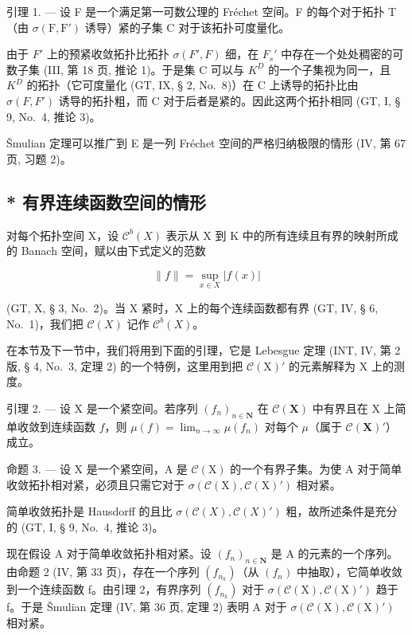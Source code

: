 引理 1. --- 设 F 是一个满足第一可数公理的 Fréchet 空间。F 的每个对于拓扑 T（由 \(\sigma(\mathrm{F},\mathrm{F}')\) 诱导）紧的子集 C 对于该拓扑可度量化。

由于 \(F'\) 上的预紧收敛拓扑比拓扑 \(\sigma(F', F)\) 细，在 \(F_{s}'\) 中存在一个处处稠密的可数子集 (III, 第 18 页, 推论 1)。于是集 C 可以与 \(K^{D}\) 的一个子集视为同一，且 \(K^{D}\) 的拓扑（它可度量化 (GT, IX, § 2, No.~8)）在 C 上诱导的拓扑比由 \(\sigma(F, F')\) 诱导的拓扑粗，而 C 对于后者是紧的。因此这两个拓扑相同 (GT, I, § 9, No.~4, 推论 3)。

Šmulian 定理可以推广到 E 是一列 Fréchet 空间的严格归纳极限的情形 (IV, 第 67 页, 习题 2)。

\subsection{* 有界连续函数空间的情形}

对每个拓扑空间 X，设 \(\mathcal{C}^{b}(X)\) 表示从 X 到 K 中的所有连续且有界的映射所成的 Banach 空间，赋以由下式定义的范数

\[
\| f \| = \sup _ {x \in X} | f (x) |\tag{6}
\]

(GT, X, § 3, No.~2)。当 X 紧时，X 上的每个连续函数都有界 (GT, IV, § 6, No.~1)，我们把 \(\mathcal{C}(X)\) 记作 \(\mathcal{C}^b(X)\)。

在本节及下一节中，我们将用到下面的引理，它是 Lebesgue 定理 (INT, IV, 第 2 版, § 4, No.~3, 定理 2) 的一个特例，这里用到把 \(\mathcal{C}(\mathrm{X})'\) 的元素解释为 X 上的测度。

引理 2. --- 设 X 是一个紧空间。若序列 \((f_n)_{n\in \mathbf{N}}\) 在 \(\mathcal{C}(\mathbf{X})\) 中有界且在 X 上简单收敛到连续函数 \(f\)，则 \(\mu(f) = \lim_{n\to \infty}\mu(f_n)\) 对每个 \(\mu\)（属于 \(\mathcal{C}(\mathbf{X})'\)）成立。

命题 3. --- 设 X 是一个紧空间，A 是 \(\mathcal{C}(\mathrm{X})\) 的一个有界子集。为使 A 对于简单收敛拓扑相对紧，必须且只需它对于 \(\sigma(\mathcal{C}(\mathrm{X}), \mathcal{C}(\mathrm{X})')\) 相对紧。

简单收敛拓扑是 Hausdorff 的且比 \(\sigma(\mathcal{C}(X), \mathcal{C}(X)')\) 粗，故所述条件是充分的 (GT, I, § 9, No.~4, 推论 3)。

现在假设 A 对于简单收敛拓扑相对紧。设 \((f_{n})_{n\in\mathbf{N}}\) 是 A 的元素的一个序列。由命题 2 (IV, 第 33 页)，存在一个序列 \((f_{n_{k}})\)（从 \((f_{n})\) 中抽取），它简单收敛到一个连续函数 f。由引理 2，有界序列 \((f_{n_{k}})\) 对于 \(\sigma(\mathcal{C}(\mathrm{X}),\mathcal{C}(\mathrm{X})')\) 趋于 f。于是 Šmulian 定理 (IV, 第 36 页, 定理 2) 表明 A 对于 \(\sigma(\mathcal{C}(\mathrm{X}),\mathcal{C}(\mathrm{X})')\) 相对紧。

